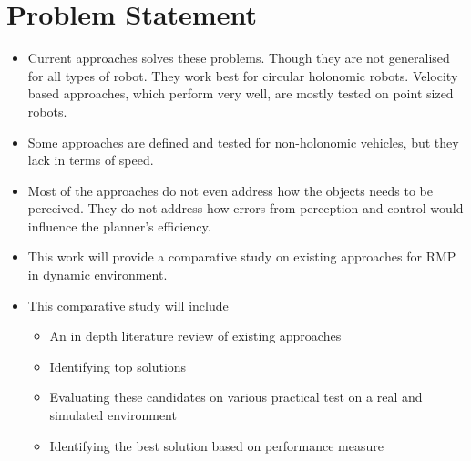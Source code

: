 \documentclass[rnd]{mas_proposal}
\begin{document}
\section{Problem Statement}
\begin{itemize}
    \item Current approaches solves these problems. Though they are not generalised for all types of robot. They work best for circular holonomic robots. Velocity based approaches, which perform very well, are mostly tested on point sized robots.
    \item Some approaches are defined and tested for non-holonomic vehicles, but they lack in terms of speed.
    \item Most of the approaches do not even address how the objects needs to be perceived. They do not address how errors from perception and control would influence the planner's efficiency.
    \item This work will provide a comparative study on existing approaches for RMP in dynamic environment.
    \item This comparative study will include 
        \begin{itemize}
            \item An in depth literature review of existing approaches
            \item Identifying top solutions
            \item Evaluating these candidates on various practical test on a real and simulated environment
            \item Identifying the best solution based on performance measure
        \end{itemize} 
\end{itemize}
\end{document}

